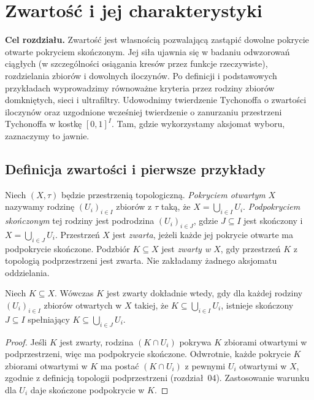 \chapter{Zwartość i jej charakterystyki}
\label{ch:topog-zwartosc}

\providecommand{\atlasref}[2]{#2}


\noindent\textbf{Cel rozdziału.}
Zwartość jest własnością pozwalającą zastąpić dowolne pokrycie
otwarte pokryciem skończonym. Jej siła ujawnia się w badaniu
odwzorowań ciągłych (w szczególności osiągania kresów
przez funkcje rzeczywiste), rozdzielania zbiorów
i dowolnych iloczynów.
Po definicji i podstawowych przykładach wyprowadzimy równoważne
kryteria przez rodziny zbiorów domkniętych, sieci i ultrafiltry.
Udowodnimy twierdzenie Tychonoffa o zwartości iloczynów oraz
uzgodnione wcześniej twierdzenie o zanurzaniu przestrzeni
Tychonoffa w kostkę $[0,1]^I$. Tam, gdzie wykorzystamy
aksjomat wyboru, zaznaczymy to jawnie.

\section{Definicja zwartości i pierwsze przykłady}
\label{sec:topog-zwartosc-definicja}

\begin{definicja}
\label{def:topog-zwartosc}
Niech $(X,\tau)$ będzie przestrzenią topologiczną.
\emph{Pokryciem otwartym} $X$ nazywamy rodzinę
$(U_i)_{i\in I}$ zbiorów z $\tau$ taką, że
$X=\bigcup_{i\in I}U_i$.
\emph{Podpokryciem skończonym} tej rodziny jest
podrodzina $(U_i)_{i\in J}$, gdzie $J\subseteq I$ jest
skończony i $X=\bigcup_{i\in J}U_i$.
Przestrzeń $X$ jest \emph{zwarta}, jeżeli każde jej
pokrycie otwarte ma podpokrycie skończone.
Podzbiór $K\subseteq X$ jest \emph{zwarty w $X$}, gdy
przestrzeń $K$ z topologią podprzestrzeni jest zwarta.
Nie zakładamy żadnego aksjomatu oddzielania.
\end{definicja}

\begin{stwierdzenie}
\label{prop:topog-zwartosc-wzgledna}
Niech $K\subseteq X$. Wówczas $K$ jest zwarty dokładnie
wtedy, gdy dla każdej rodziny $(U_i)_{i\in I}$ zbiorów
otwartych w $X$ takiej, że $K\subseteq\bigcup_{i\in I}U_i$,
istnieje skończony $J\subseteq I$ spełniający
$K\subseteq\bigcup_{i\in J}U_i$.
\end{stwierdzenie}
\begin{proof}
Jeśli $K$ jest zwarty, rodzina $(K\cap U_i)$ pokrywa
$K$ zbiorami otwartymi w podprzestrzeni, więc ma
podpokrycie skończone. Odwrotnie, każde pokrycie $K$
zbiorami otwartymi w $K$ ma postać $(K\cap U_i)$
z pewnymi $U_i$ otwartymi w $X$, zgodnie z definicją
topologii podprzestrzeni (rozdział~04). Zastosowanie
warunku dla $U_i$ daje skończone podpokrycie w $K$.
\end{proof}

